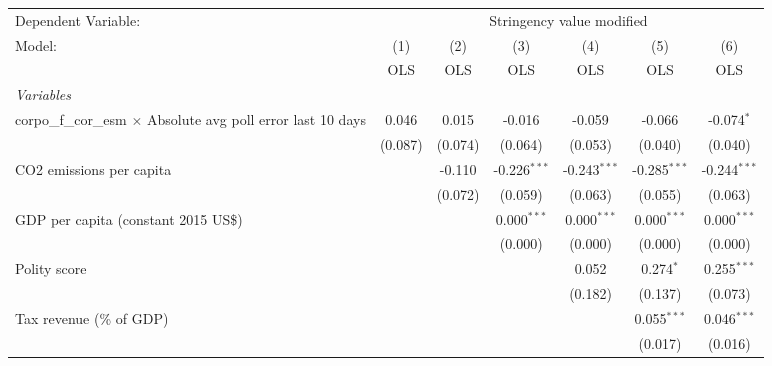 
\begingroup
\centering
\begin{tabular}{lcccccc}
   \toprule
   Dependent Variable: & \multicolumn{6}{c}{Stringency value modified}\\
   Model:                                                               & (1)     & (2)     & (3)            & (4)            & (5)            & (6)\\  
                                                                        &  OLS    & OLS     & OLS            & OLS            & OLS            & OLS\\  
   \midrule
   \emph{Variables}\\
   corpo\_f\_cor\_esm $\times$ Absolute avg poll error last 10 days     & 0.046   & 0.015   & -0.016         & -0.059         & -0.066         & -0.074$^{*}$\\   
                                                                        & (0.087) & (0.074) & (0.064)        & (0.053)        & (0.040)        & (0.040)\\   
   CO2 emissions per capita                                             &         & -0.110  & -0.226$^{***}$ & -0.243$^{***}$ & -0.285$^{***}$ & -0.244$^{***}$\\   
                                                                        &         & (0.072) & (0.059)        & (0.063)        & (0.055)        & (0.063)\\   
   GDP per capita (constant 2015 US\$)                                  &         &         & 0.000$^{***}$  & 0.000$^{***}$  & 0.000$^{***}$  & 0.000$^{***}$\\   
                                                                        &         &         & (0.000)        & (0.000)        & (0.000)        & (0.000)\\   
   Polity score                                                         &         &         &                & 0.052          & 0.274$^{*}$    & 0.255$^{***}$\\   
                                                                        &         &         &                & (0.182)        & (0.137)        & (0.073)\\   
   Tax revenue (\% of GDP)                                              &         &         &                &                & 0.055$^{***}$  & 0.046$^{***}$\\   
                                                                        &         &         &                &                & (0.017)        & (0.016)\\   

\end{tabular}
